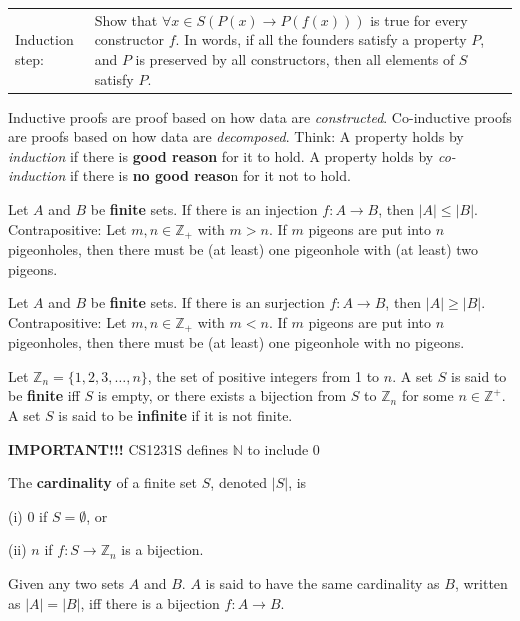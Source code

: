 \documentclass{article}
\begin{document}
\begin{description}
\begin{table}[h]
\begin{tabular}{lp{6in}}
			Induction step: & Show that $\forall x\in S(P(x)\to P(f(x)))$ is true for every constructor $f$. In words, if all the founders satisfy a property $P$, and $P$ is preserved by all constructors, then all elements of $S$ satisfy $P$. \\
		\end{tabular}
	\end{table}	     
	\endgroup
	\item[Induction vs Co-Induction] Inductive proofs are proof based on how data are \emph{constructed}. Co-inductive proofs are proofs based on how data are \emph{decomposed}. Think: A property holds by \emph{induction} if there is \textbf{good reason} for it to hold. A property holds by \emph{co-induction} if there is \textbf{no good reaso}n for it not to hold.
	
	\vspace{0.2cm}
    \item[\large Cardinality]
    \item[Pigeonhole Principle]Let $A$ and $B$ be \textbf{finite} sets. If there is an injection $f:A\to B$, then $|A| \leq |B|$. Contrapositive: Let $m, n\in\mathbb{Z}_{+}$ with $m > n$. If $m$ pigeons are put into $n$ pigeonholes, then there must be (at least) one pigeonhole with (at least) two pigeons.
    \item[Dual Pigeonhole Principles]Let $A$ and $B$ be \textbf{finite} sets. If there is an surjection $f:A\to B$, then $|A| \geq |B|$. Contrapositive: Let $m, n\in\mathbb{Z}_{+}$ with $m < n$. If $m$ pigeons are put into $n$ pigeonholes, then there must be (at least) one pigeonhole with no pigeons.
    \item[Finite set and Infinite set]Let $\mathbb{Z}_{n} = \{1,2,3,\dots,n\}$, the set of positive integers from 1 to $n$. A set $S$ is said to be \textbf{finite} iff $S$ is empty, or there exists a bijection from $S$ to $\mathbb{Z}_{n}$ for some $n\in\mathbb{Z}^{+}$. A set $S$ is said to be \textbf{infinite} if it is not finite.
    \item \qquad \textbf{IMPORTANT!!!} CS1231S defines $\mathbb{N}$ to include 0
    \item[Cardinality]The \textbf{cardinality} of a finite set $S$, denoted $|S|$, is 
    \item \qquad \;(i) 0 if $S=\emptyset$, or 
    \item \qquad (ii) $n$ if $f:S\to \mathbb{Z}_{n}$ is a bijection.
    \item[Same Cardinality (Cantor)] Given any two sets $A$ and $B$. $A$ is said to have the same cardinality as $B$, written as $|A| = |B|$, iff there is a bijection $f:A\to B$.

\end{description}
\end{document}
